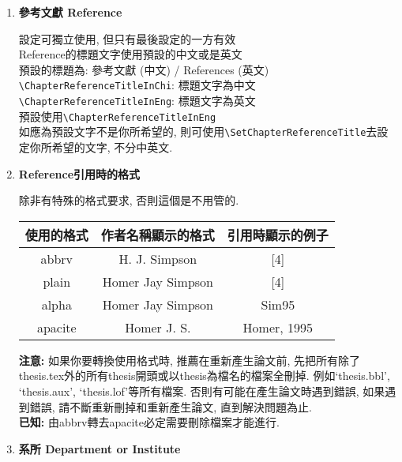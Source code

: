 \begin{enumerate}
  \item
  {
    \textbf{參考文獻 Reference}

     設定可獨立使用, 但只有最後設定的一方有效\\

     Reference的標題文字使用預設的中文或是英文\\
     預設的標題為: 參考文獻 (中文) / References (英文)\\
     \verb|\ChapterReferenceTitleInChi|:  標題文字為中文\\
     \verb|\ChapterReferenceTitleInEng|:  標題文字為英文\\
     預設使用\verb|\ChapterReferenceTitleInEng|\\

     如應為預設文字不是你所希望的,  則可使用\verb|\SetChapterReferenceTitle|去設定你所希望的文字, 不分中英文.
  } %

  \item
  {
    \textbf{Reference引用時的格式}

    除非有特殊的格式要求, 否則這個是不用管的.\\

  \InsertTable
    {
        \begin{tabular}{|c|c|c|}
        \hline
        使用的格式   & 作者名稱顯示的格式         & 引用時顯示的例子    \\ \hline
        abbrv   & H. J. Simpson     & {[}4{]}     \\ \hline
        plain   & Homer Jay Simpson & {[}4{]}     \\ \hline
        alpha   & Homer Jay Simpson & Sim95       \\ \hline
        apacite & Homer J. S.       & Homer, 1995 \\ \hline
        \end{tabular}
    }

 \textbf{注意:} 如果你要轉換使用格式時, 推薦在重新產生論文前, 先把所有除了thesis.tex外的所有thesis開頭或以thesis為檔名的檔案全刪掉. 例如`thesis.bbl', `thesis.aux', `thesis.lof'等所有檔案.  否則有可能在產生論文時遇到錯誤, 如果遇到錯誤, 請不斷重新刪掉和重新產生論文, 直到解決問題為止.\\

 \textbf{已知:} 由abbrv轉去apacite必定需要刪除檔案才能進行.
  } %

  \item
  {
    \textbf{系所 Department or Institute}

}
\end{enumerate}
